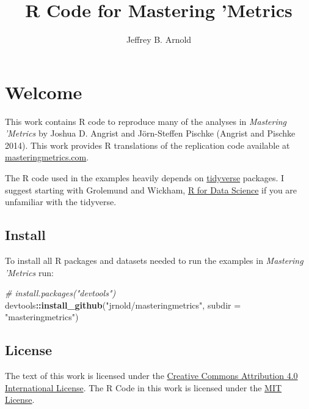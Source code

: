 \documentclass[]{book}
\title{R Code for Mastering 'Metrics}
\author{Jeffrey B. Arnold}
\date{}
\newenvironment{Shaded}{\begin{snugshade}}{\end{snugshade}}
\newcommand{\CommentTok}[1]{\textcolor[rgb]{0.56,0.35,0.01}{\textit{#1}}}
\newcommand{\DataTypeTok}[1]{\textcolor[rgb]{0.13,0.29,0.53}{#1}}
\newcommand{\KeywordTok}[1]{\textcolor[rgb]{0.13,0.29,0.53}{\textbf{#1}}}
\newcommand{\NormalTok}[1]{#1}
\newcommand{\OperatorTok}[1]{\textcolor[rgb]{0.81,0.36,0.00}{\textbf{#1}}}
\newcommand{\StringTok}[1]{\textcolor[rgb]{0.31,0.60,0.02}{#1}}
\theoremstyle{definition}
\theoremstyle{definition}
\theoremstyle{definition}
\theoremstyle{remark}
\begin{document}
\maketitle

{
\setcounter{tocdepth}{1}
\tableofcontents
}
\hypertarget{welcome}{%
\chapter*{Welcome}\label{welcome}}

This work contains R code to reproduce many of the analyses in
\emph{Mastering 'Metrics} by Joshua D. Angrist and Jörn-Steffen Pischke
(Angrist and Pischke 2014). This work provides R translations of the
replication code available at
\href{http://masteringmetrics.com/resources/}{masteringmetrics.com}.

The R code used in the examples heavily depends on
\href{https://www.tidyverse.org/}{tidyverse} packages. I suggest
starting with Grolemund and Wickham, \href{http://r4ds.had.co.nz/}{R for
Data Science} if you are unfamiliar with the tidyverse.

\hypertarget{install}{%
\section*{Install}\label{install}}

To install all R packages and datasets needed to run the examples in
\emph{Mastering 'Metrics} run:

\begin{Shaded}
\begin{Highlighting}[]
\CommentTok{# install.packages("devtools")}
\NormalTok{devtools}\OperatorTok{::}\KeywordTok{install_github}\NormalTok{(}\StringTok{"jrnold/masteringmetrics"}\NormalTok{, }\DataTypeTok{subdir =} \StringTok{"masteringmetrics"}\NormalTok{)}
\end{Highlighting}
\end{Shaded}

\hypertarget{license}{%
\section*{License}\label{license}}

The text of this work is licensed under the
\href{http://creativecommons.org/licenses/by/4.0/}{Creative Commons
Attribution 4.0 International License}. The R Code in this work is
licensed under the \href{https://opensource.org/licenses/MIT}{MIT
License}.
\end{document}
